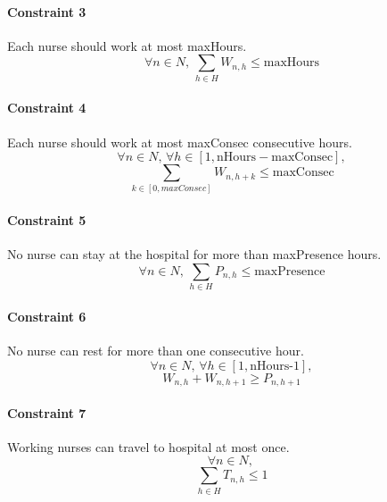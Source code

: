\documentclass[12pt,a4paper]{article}
\begin{document}
\paragraph{Constraint 3} Each nurse should work at most maxHours.
$$ \forall n \in N,\, \sum_{h \in H} W_{n,h} \le \textrm{maxHours} $$
%
\paragraph{Constraint 4} Each nurse should work at most maxConsec consecutive
hours.
$$ \forall n \in N,\, \forall h \in [1, \textrm{nHours} - \textrm{maxConsec}],$$
$$\sum_{k \in [0, maxConsec]} W_{n, h+k} \le \textrm{maxConsec}
$$
%
\paragraph{Constraint 5} No nurse can stay at the hospital for more than
maxPresence hours.
$$ \forall n \in N, \, \sum_{h \in H} P_{n,h} \le \textrm{maxPresence} $$
%
\paragraph{Constraint 6} No nurse can rest for more than one consecutive hour.
$$ \forall n \in N,\, \forall h \in [1, \textrm{nHours-1}],$$
$$W_{n, h} + W_{n, h+1} \ge P_{n,h+1} $$
%
\paragraph{Constraint 7} Working nurses can travel to hospital at most once.
$$ \forall n \in N,\,$$
$$ \sum_{h \in H} T_{n,h} \le 1 $$
%
\end{document}
